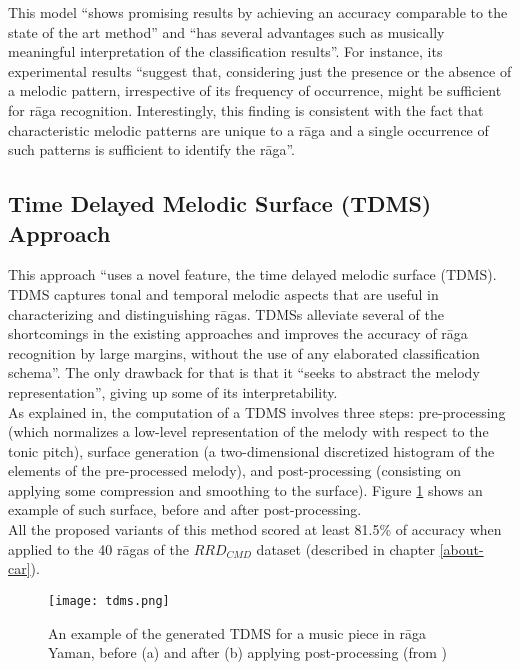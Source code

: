 This model ``shows promising results by achieving an accuracy comparable to the state of the art method'' and ``has several advantages such as musically meaningful interpretation of the classification results''\cite[p.191]{gulati}. For instance, its experimental results ``suggest that, considering just the presence or the absence of a melodic pattern, irrespective of its frequency of occurrence, might be sufficient for r\=aga recognition. Interestingly, this finding is consistent with the fact that characteristic melodic patterns are unique to a r\=aga and a single occurrence of such patterns is sufficient to identify the r\=aga''\cite[p.186]{gulati}.\\


\subsection{Time Delayed Melodic Surface (TDMS) Approach}

This approach ``uses a novel feature, the time delayed melodic surface (TDMS). TDMS captures tonal and temporal melodic aspects that are useful in characterizing and distinguishing rāgas. TDMSs alleviate several of the shortcomings in the existing approaches and improves the accuracy of r\=aga recognition by large margins, without the use of any elaborated classification schema''. The only drawback for that is that it ``seeks to abstract the melody representation'', giving up some of its interpretability.\\

As explained in\cite[p.192]{gulati}, the computation of a TDMS involves three steps: pre-processing (which normalizes a low-level representation of the melody with respect to the tonic pitch), surface generation (a two-dimensional discretized histogram of the elements of the pre-processed melody), and post-processing (consisting on applying some compression and smoothing to the surface). Figure \ref{fig:tdms} shows an example of such surface, before and after post-processing.\\

All the proposed variants of this method scored at least 81.5\% of accuracy when applied to the 40 r\=agas of the \(RRD_{CMD}\) dataset (described in chapter \ref{about-car}).


\begin{figure}[h]
  \centering
  \texttt{[image: tdms.png]}
  \caption{An example of the generated TDMS for a music piece in r\=aga Yaman, before (a) and after (b) applying post-processing (from \cite[p.195]{gulati})}
  \label{fig:tdms}
\end{figure}


